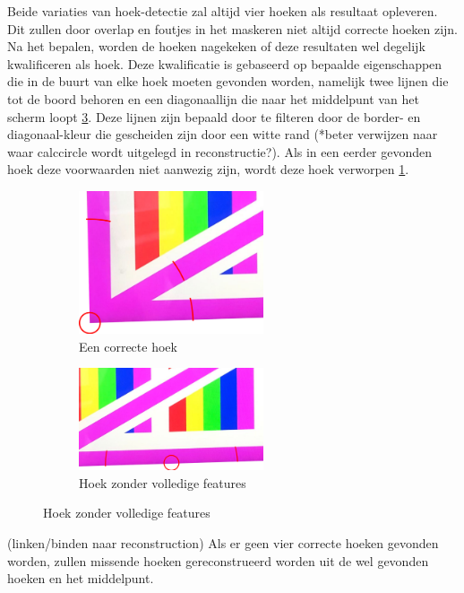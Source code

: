 Beide variaties van hoek-detectie zal altijd vier hoeken als resultaat opleveren. Dit zullen door overlap en foutjes in het maskeren niet altijd correcte hoeken zijn. Na het bepalen, worden de hoeken nagekeken of deze resultaten wel degelijk kwalificeren als hoek. Deze kwalificatie is gebaseerd op bepaalde eigenschappen die in de buurt van elke hoek moeten gevonden worden, namelijk twee lijnen die tot de boord behoren en een diagonaallijn die naar het middelpunt van het scherm loopt \ref{fig:foute hoek}. Deze lijnen zijn bepaald door te filteren door de border- en diagonaal-kleur die gescheiden zijn door een witte rand (*beter verwijzen naar waar calccircle wordt uitgelegd in reconstructie?). Als in een eerder gevonden hoek deze voorwaarden niet aanwezig zijn, wordt deze hoek verworpen \ref{fig:correcte hoek}. \\

\begin{figure}[h] 
\centering
\begin{subfigure}{0.5\textwidth}
\label{fig:correcte hoek}
\centering
\includegraphics[width=0.6\textwidth]{img/correctCorner.png}
\caption{Een correcte hoek}
\end{subfigure}%
\begin{subfigure}{0.5\textwidth}
\label{fig:foute hoek}
\centering
\includegraphics[width=0.6\textwidth]{img/notACorner.png}
\caption{Hoek zonder volledige features}
\end{subfigure}{}
\end{figure}

(linken/binden naar reconstruction) Als er geen vier correcte hoeken gevonden worden, zullen missende hoeken gereconstrueerd worden uit de wel gevonden hoeken en het middelpunt.